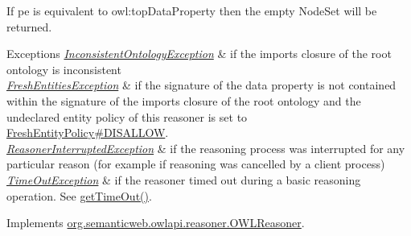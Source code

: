 If {\ttfamily pe} is equivalent to {\ttfamily owl\-:top\-Data\-Property} then the empty {\ttfamily Node\-Set} will be returned.


\begin{DoxyExceptions}{Exceptions}
{\em \hyperlink{classorg_1_1semanticweb_1_1owlapi_1_1reasoner_1_1_inconsistent_ontology_exception}{Inconsistent\-Ontology\-Exception}} & if the imports closure of the root ontology is inconsistent \\
\hline
{\em \hyperlink{classorg_1_1semanticweb_1_1owlapi_1_1reasoner_1_1_fresh_entities_exception}{Fresh\-Entities\-Exception}} & if the signature of the data property is not contained within the signature of the imports closure of the root ontology and the undeclared entity policy of this reasoner is set to \hyperlink{enumorg_1_1semanticweb_1_1owlapi_1_1reasoner_1_1_fresh_entity_policy_a762eae6d5b2449d125311ecaabfdc8d0}{Fresh\-Entity\-Policy\#\-D\-I\-S\-A\-L\-L\-O\-W}. \\
\hline
{\em \hyperlink{classorg_1_1semanticweb_1_1owlapi_1_1reasoner_1_1_reasoner_interrupted_exception}{Reasoner\-Interrupted\-Exception}} & if the reasoning process was interrupted for any particular reason (for example if reasoning was cancelled by a client process) \\
\hline
{\em \hyperlink{classorg_1_1semanticweb_1_1owlapi_1_1reasoner_1_1_time_out_exception}{Time\-Out\-Exception}} & if the reasoner timed out during a basic reasoning operation. See \hyperlink{classorg_1_1semanticweb_1_1owlapi_1_1reasoner_1_1impl_1_1_o_w_l_reasoner_base_af55342eaaabb1b72dacfde7a181b93d2}{get\-Time\-Out()}. \\
\hline
\end{DoxyExceptions}


Implements \hyperlink{interfaceorg_1_1semanticweb_1_1owlapi_1_1reasoner_1_1_o_w_l_reasoner_a9c2703f5b0202c909e29ddd2169a282e}{org.\-semanticweb.\-owlapi.\-reasoner.\-O\-W\-L\-Reasoner}.

